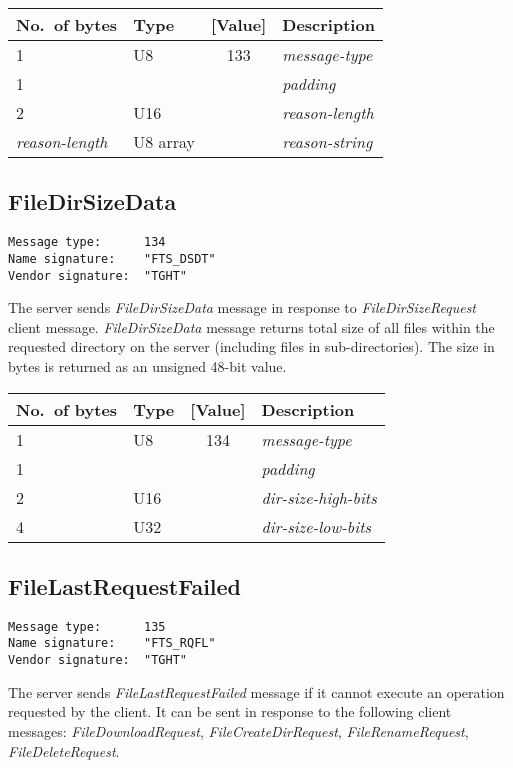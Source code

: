 \documentclass[a4paper]{article}
\newcommand{\typestr}[1]{\textit{#1}}
\begin{document}
\begin{tabular}{l|lc|l} \hline
No.\ of bytes & Type & [Value] & Description \\ \hline
1 & U8  & 133 & \typestr{message-type} \\
1 &     &     & \typestr{padding} \\
2 & U16 &     & \typestr{reason-length} \\
\typestr{reason-length} & U8 array & & \typestr{reason-string} \\
\hline\end{tabular}


\newpage
\subsection{FileDirSizeData}
\begin{verbatim}
Message type:      134
Name signature:    "FTS_DSDT"
Vendor signature:  "TGHT"
\end{verbatim}

The server sends \typestr{FileDirSizeData} message in response to
\typestr{FileDirSizeRequest} client message. \typestr{FileDirSizeData}
message returns total size of all files within the requested directory
on the server (including files in sub-directories). The size in bytes
is returned as an unsigned 48-bit value.

\begin{tabular}{l|lc|l} \hline
No.\ of bytes & Type & [Value] & Description \\ \hline
1 & U8  & 134 & \typestr{message-type} \\
1 &     &     & \typestr{padding} \\
2 & U16 &     & \typestr{dir-size-high-bits} \\
4 & U32 &     & \typestr{dir-size-low-bits} \\
\hline\end{tabular}

\newpage
\subsection{FileLastRequestFailed}
\begin{verbatim}
Message type:      135
Name signature:    "FTS_RQFL"
Vendor signature:  "TGHT"
\end{verbatim}

The server sends \typestr{FileLastRequestFailed} message if it cannot
execute an operation requested by the client. It can be sent in
response to the following client messages:
\typestr{FileDownloadRequest}, \typestr{FileCreateDirRequest},
\typestr{FileRenameRequest}, \typestr{FileDeleteRequest}.
\end{document}
